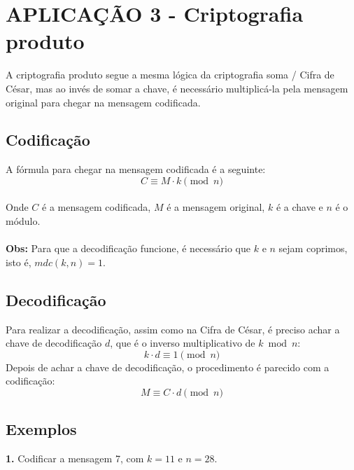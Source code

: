 \section{APLICAÇÃO 3 - Criptografia produto}
A criptografia produto segue a mesma lógica da criptografia soma / Cifra de César, mas ao invés de somar a chave, é necessário multiplicá-la pela mensagem original para chegar na mensagem codificada.

\subsection{Codificação}
A fórmula para chegar na mensagem codificada é a seguinte:\\
\[
    C \equiv M \cdot k \pmod {n}
\]\\
Onde $C$ é a mensagem codificada, $M$ é a mensagem original, $k$ é a chave e $n$ é o módulo.\\\\
\textbf{Obs:} Para que a decodificação funcione, é necessário que $k$ e $n$ sejam coprimos, isto é, $mdc(k,n) = 1$.

\subsection{Decodificação}
Para realizar a decodificação, assim como na Cifra de César, é preciso achar a chave de decodificação $d$, que é o inverso multiplicativo de $k \bmod n$:
\[
    k \cdot d \equiv 1 \pmod {n}
\]
Depois de achar a chave de decodificação, o procedimento é parecido com a codificação:
\[
    M \equiv C \cdot d \pmod {n}
\]

\subsection*{Exemplos}
\textbf{1.} Codificar a mensagem 7, com $k = 11$ e $n = 28$.

